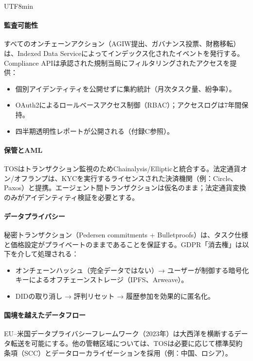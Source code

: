 \documentclass[11pt]{article}
\begin{document}
\begin{CJK}{UTF8}{min}
\begin{itemize}[noitemsep]
\paragraph{監査可能性}
すべてのオンチェーンアクション（AGIW提出、ガバナンス投票、財務移転）は、Indexed Data Serviceによってインデックス化されたイベントを発行する。Compliance APIは承認された規制当局にフィルタリングされたアクセスを提供：
\begin{itemize}[noitemsep]
  \item 個別アイデンティティを公開せずに集約統計（月次タスク量、紛争率）。
  \item OAuth2によるロールベースアクセス制御（RBAC）；アクセスログは7年間保持。
  \item 四半期透明性レポートが公開される（付録C参照）。
\end{itemize}

\paragraph{保管とAML}
TOSはトランザクション監視のためChainalysis/Ellipticと統合する。法定通貨オン/オフランプは、KYCを実行するライセンスされた決済機関（例：Circle、Paxos）と提携。エージェント間トランザクションは仮名のまま；法定通貨変換のみがアイデンティティ検証を必要とする。

\paragraph{データプライバシー}
秘密トランザクション（Pedersen commitments + Bulletproofs）は、タスク仕様と価格設定がプライベートのままであることを保証する。GDPR「消去権」は以下を介して処理される：
\begin{itemize}[noitemsep]
  \item オンチェーンハッシュ（完全データではない）→ ユーザーが制御する暗号化キーによるオフチェーンストレージ（IPFS、Arweave）。
  \item DIDの取り消し → 評判リセット → 履歴参加を効果的に匿名化。
\end{itemize}

\paragraph{国境を越えたデータフロー}
EU--米国データプライバシーフレームワーク（2023年）は大西洋を横断するデータ転送を可能にする。他の管轄区域については、TOSは必要に応じて標準契約条項（SCC）とデータローカライゼーションを採用（例：中国、ロシア）。


\end{itemize}
\end{CJK}
\end{document}
